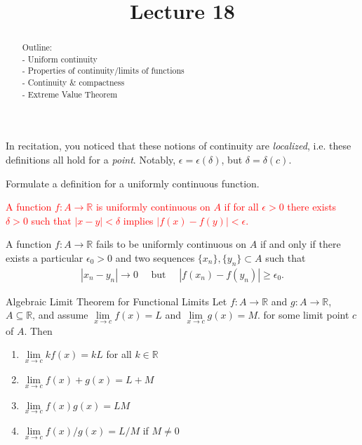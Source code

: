 \documentclass{ximera}
\begin{document}
    \title{Lecture 18}
    
    \begin{abstract}  
    Outline: \\
    - Uniform continuity \\
    - Properties of continuity/limits of functions \\
    - Continuity \& compactness \\
    - Extreme Value Theorem
\end{abstract}

\maketitle

In recitation, you noticed that these notions of continuity are \textit{localized}, i.e. these definitions all hold for a \textit{point}.  Notably, $\epsilon = \epsilon(\delta)$, but $\delta = \delta(c)$.

\begin{exercise}
    Formulate a definition for a uniformly continuous function.
\end{exercise}
\vspace{-0.2in}
\textcolor{red}{\begin{definition}
    A function $f:A \to \mathbb{R}$ is uniformly continuous on $A$ if for all $\epsilon > 0$ there exists $\delta > 0$ such that $|x-y| < \delta$ implies $|f(x) - f(y)| < \epsilon$.
\end{definition}}

\begin{theorem}
    A function $f:A \to \mathbb{R}$ fails to be uniformly continuous on $A$ if and only if there exists a particular $\epsilon_0 > 0$ and two sequences $\{x_n\}, \{y_n\} \subset A$ such that 
    \begin{align}
        |x_n -y_n| \to 0 \quad \text{ but } \quad |f(x_n) - f(y_n)| \geq \epsilon _0.
    \end{align}
\end{theorem}

\begin{theorem}{Algebraic Limit Theorem for Functional Limits}
    Let $f:A \to \mathbb{R}$ and $g:A \to \mathbb{R}$, $A \subseteq \mathbb{R}$, and assume $\lim\limits_{x\to c} f(x) = L$ and $\lim\limits_{x\to c} g(x) = M$. for some limit point $c$ of $A$.  Then
    \begin{enumerate}
        \item $\lim\limits_{x\to c} kf(x) = kL$ for all $k \in \mathbb{R}$
        \item $\lim\limits_{x\to c} f(x) +g(x) = L+M$
        \item $\lim\limits_{x\to c} f(x)g(x) = LM$
        \item $\lim\limits_{x\to c} f(x)/g(x) = L/M$ if $M \neq 0$
    \end{enumerate}
\end{theorem}
\end{document}
